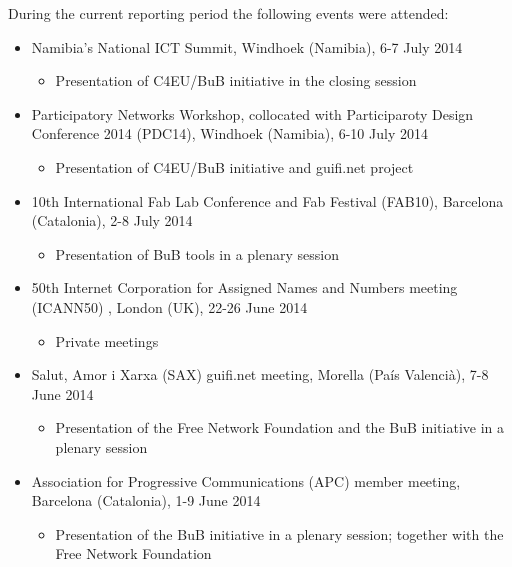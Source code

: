 During the current reporting period the following events were attended:
\begin{itemize}
  \setlength{\itemindent}{2em}
  
  \item Namibia's National ICT Summit, Windhoek (Namibia), 6-7 July 2014
  \begin{itemize} \setlength{\itemindent}{2em} \item Presentation of C4EU/BuB initiative in the closing session \end{itemize}
  
  \item Participatory Networks Workshop, collocated with Participaroty Design Conference 2014 (PDC14), Windhoek (Namibia), 6-10 July 2014
  \begin{itemize} \setlength{\itemindent}{2em} \item Presentation of C4EU/BuB initiative and guifi.net project \end{itemize}
  
  \item 10th International Fab Lab Conference and Fab Festival (FAB10), Barcelona (Catalonia), 2-8 July 2014
  \begin{itemize} \setlength{\itemindent}{2em} \item Presentation of BuB tools in a plenary session \end{itemize}
  
  \item 50th Internet Corporation for Assigned Names and Numbers meeting (ICANN50) , London (UK), 22-26 June 2014
  \begin{itemize} \setlength{\itemindent}{2em} \item Private meetings \end{itemize}
  
  \item Salut, Amor i Xarxa (SAX) guifi.net meeting, Morella (Pa\'{i}s Valenci\`{a}), 7-8 June 2014
  \begin{itemize} \setlength{\itemindent}{2em} \item Presentation of the Free Network Foundation and the BuB initiative in a plenary session\end{itemize}
  
  \item Association for Progressive Communications (APC) member meeting, Barcelona (Catalonia), 1-9 June 2014
  \begin{itemize} \setlength{\itemindent}{2em} \item Presentation of the BuB initiative in a plenary session; together with the Free Network Foundation \end{itemize}
  

\end{itemize}
